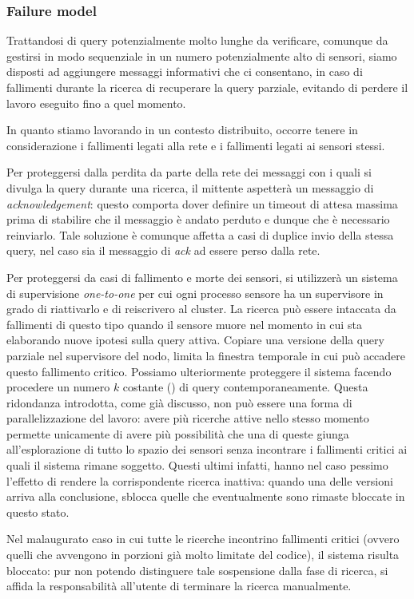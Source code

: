 \documentclass{llncs}
\begin{document}
\subsubsection*{Failure model}
Trattandosi di query potenzialmente molto lunghe da verificare,
comunque da gestirsi in modo sequenziale in un numero potenzialmente
alto di sensori,
siamo disposti ad aggiungere messaggi informativi che ci consentano,
in caso di fallimenti durante la ricerca di recuperare la query parziale,
evitando di perdere il lavoro eseguito fino a quel momento.

In quanto stiamo lavorando in un contesto distribuito,
occorre tenere in considerazione i fallimenti legati alla rete e i
fallimenti legati ai sensori stessi.

Per proteggersi dalla perdita da parte della rete dei messaggi
con i quali si divulga la query durante una ricerca,
il mittente aspetterà un messaggio di \emph{acknowledgement}: questo
comporta dover definire un timeout di attesa massima prima di
stabilire che il messaggio è andato perduto e dunque che è necessario
reinviarlo. Tale soluzione è comunque affetta a casi di duplice invio
della stessa query, nel caso sia il messaggio di \emph{ack} ad
essere perso dalla rete.

Per proteggersi da casi di fallimento e morte dei sensori,
si utilizzerà un sistema di supervisione \emph{one-to-one}
per cui ogni processo sensore ha un supervisore in grado di
riattivarlo e di reiscrivero al cluster.
La ricerca può essere intaccata da fallimenti di questo tipo
quando il sensore muore nel momento in cui sta elaborando
nuove ipotesi sulla query attiva.
Copiare una versione della query parziale nel supervisore del nodo,
limita la finestra temporale in cui può accadere questo fallimento
critico.
Possiamo ulteriormente proteggere il sistema facendo procedere
un numero $k$ costante () di query
contemporaneamente. Questa ridondanza introdotta, come già discusso,
non può essere una forma di parallelizzazione del lavoro: avere
più ricerche attive nello stesso momento permette unicamente di
avere più possibilità che una di queste giunga all'esplorazione
di tutto lo spazio dei sensori senza incontrare i fallimenti critici
ai quali il sistema rimane soggetto.
Questi ultimi infatti, hanno nel caso pessimo l'effetto di
rendere la corrispondente ricerca inattiva: quando una delle versioni
arriva alla conclusione, sblocca quelle che eventualmente sono rimaste
bloccate in questo stato.

Nel malaugurato caso in cui tutte le ricerche incontrino fallimenti
critici (ovvero quelli che avvengono in porzioni già molto limitate
del codice), il sistema risulta bloccato: pur non potendo
distinguere tale sospensione dalla fase di ricerca, si affida
la responsabilità all'utente di terminare la ricerca manualmente.
\end{document}
